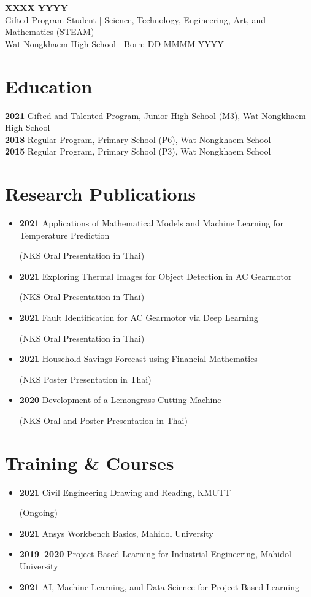 \documentclass[a4paper,11pt]{article}
\newcommand{\sectiontitle}[1]{\section*{#1}}
\newcommand{\entry}[2]{\textbf{#1} \hfill #2 \\}
\newcommand{\subentry}[1]{\parbox[t]{\dimexpr\textwidth-2em}{#1}}
\begin{document}
\begin{center}
    {\LARGE \textbf{XXXX YYYY}} \\
    \vspace{0.2cm}
    Gifted Program Student | Science, Technology, Engineering, Art, and Mathematics (STEAM) \\
    Wat Nongkhaem High School | Born: DD MMMM YYYY \\
\end{center}

\vspace{0.3cm}

\sectiontitle{Education}
\entry{2021}{Gifted and Talented Program, Junior High School (M3), Wat Nongkhaem High School}
\entry{2018}{Regular Program, Primary School (P6), Wat Nongkhaem School}
\entry{2015}{Regular Program, Primary School (P3), Wat Nongkhaem School}

\sectiontitle{Research Publications}
\begin{itemize}[leftmargin=*,label={}]
    \item \entry{2021}{Applications of Mathematical Models and Machine Learning for Temperature Prediction} \subentry{(NKS Oral Presentation in Thai)}
    \item \entry{2021}{Exploring Thermal Images for Object Detection in AC Gearmotor} \subentry{(NKS Oral Presentation in Thai)}
    \item \entry{2021}{Fault Identification for AC Gearmotor via Deep Learning} \subentry{(NKS Oral Presentation in Thai)}
    \item \entry{2021}{Household Savings Forecast using Financial Mathematics} \subentry{(NKS Poster Presentation in Thai)}
    \item \entry{2020}{Development of a Lemongrass Cutting Machine} \subentry{(NKS Oral and Poster Presentation in Thai)}
\end{itemize}

\sectiontitle{Training \& Courses}
\begin{itemize}[leftmargin=*,label={}]
    \item \entry{2021}{Civil Engineering Drawing and Reading, KMUTT} \subentry{(Ongoing)}
    \item \entry{2021}{Ansys Workbench Basics, Mahidol University}
    \item \entry{2019--2020}{Project-Based Learning for Industrial Engineering, Mahidol University}
    \item \entry{2021}{AI, Machine Learning, and Data Science for Project-Based Learning}
\end{itemize}
\end{document}
